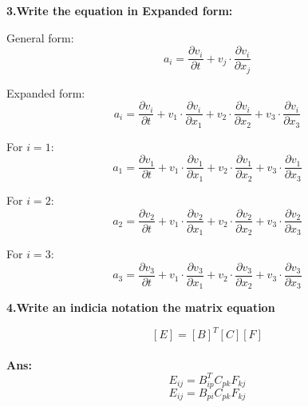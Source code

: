 \documentclass[a4paper,12pt]{article}
\begin{document}
\textbf{3.Write the equation in Expanded form:}

\begin{enumerate}
     General form:
    \[
    a_i = \frac{\partial v_i}{\partial t} + v_j \cdot \frac{\partial v_i}{\partial x_j}
    \]

    Expanded form:
    \[
    a_i = \frac{\partial v_i}{\partial t} + v_1 \cdot \frac{\partial v_i}{\partial x_1} + v_2 \cdot \frac{\partial v_i}{\partial x_2} + v_3 \cdot \frac{\partial v_i}{\partial x_3}
    \]

    For \(i=1\):
    \[
    a_1 = \frac{\partial v_1}{\partial t} + v_1 \cdot \frac{\partial v_1}{\partial x_1} + v_2 \cdot \frac{\partial v_1}{\partial x_2} + v_3 \cdot \frac{\partial v_1}{\partial x_3}
    \]

   For \(i=2\):
    \[
    a_2 = \frac{\partial v_2}{\partial t} + v_1 \cdot \frac{\partial v_2}{\partial x_1} + v_2 \cdot \frac{\partial v_2}{\partial x_2} + v_3 \cdot \frac{\partial v_2}{\partial x_3}
    \]

     For \(i=3\):
    \[
    a_3 = \frac{\partial v_3}{\partial t} + v_1 \cdot \frac{\partial v_3}{\partial x_1} + v_2 \cdot \frac{\partial v_3}{\partial x_2} + v_3 \cdot \frac{\partial v_3}{\partial x_3}
    \]    
\end{enumerate}



\textbf{4.Write an indicia notation the matrix equation}

    \[[E] =[B]^T [C] [F]\]
    \\
    \textbf{Ans:}
    \[E_{ij}=B_{ip}^T C_{pk} F_{kj}\]
    \[E_{ij}=B_{pi} C_{pk} F_{kj}\]
    \\
    
\end{document}
